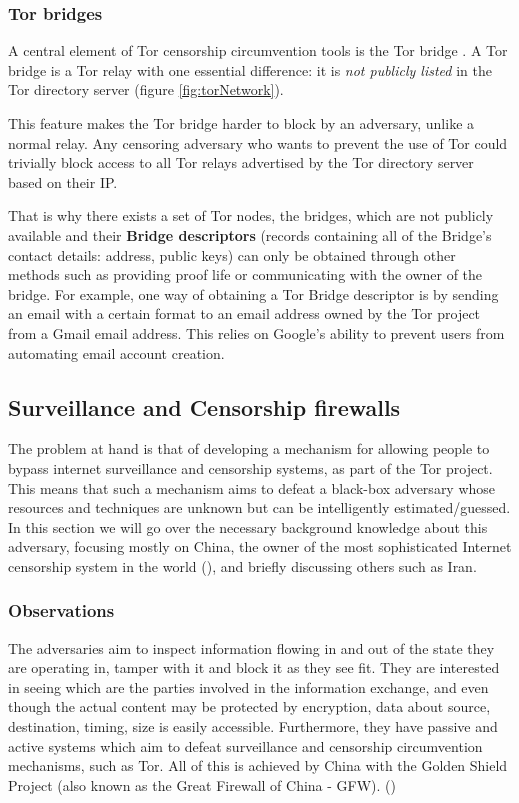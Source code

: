 \documentclass[11pt]{article} %
\begin{document}
\subsubsection{Tor bridges}

A central element of Tor censorship circumvention tools is the Tor bridge \citep*{web:torBridges}. A Tor bridge is a Tor relay with one essential difference: it is \textit{not publicly listed} in the Tor directory server (figure \ref{fig:torNetwork}). 

This feature makes the Tor bridge harder to block by an adversary, unlike a normal relay. Any censoring adversary who wants to prevent the use of Tor could trivially block access to all Tor relays advertised by the Tor directory server based on their IP.

That is why there exists a set of Tor nodes, the bridges, which are not publicly available and their \textbf{Bridge descriptors} (records containing all of the Bridge's contact details: address, public keys) can only be obtained through other methods such as providing proof life or communicating with the owner of the bridge. For example, one way of obtaining a Tor Bridge descriptor is by sending an email with a certain format to an email address owned by the Tor project from a Gmail email address. This relies on Google's ability to prevent users from automating email account creation.


\subsection{Surveillance and Censorship firewalls}

The problem at hand is that of developing a mechanism for allowing people to bypass internet surveillance and censorship systems, as part of  the Tor project. This means that such a mechanism aims to defeat a black-box adversary whose resources and techniques are unknown but can be intelligently estimated/guessed. In this section we will go over the necessary background knowledge about this adversary, focusing mostly on China, the owner of the most sophisticated Internet censorship system in the world (\citep*{web:openNet}), and briefly discussing others such as Iran.

\subsubsection{Observations}

The adversaries aim to inspect information flowing in and out of the state they are operating in, tamper with it and block it as they see fit. They are interested in seeing which are the parties involved in the information exchange, and even though the actual content may be protected by encryption, data about source, destination, timing, size is easily accessible. Furthermore, they have passive and active systems which aim to defeat surveillance and censorship circumvention mechanisms, such as Tor. All of this is achieved by China with the Golden Shield Project (also known as the Great Firewall of China - GFW). (\citep*{web:hikingGFW})
\end{document}

